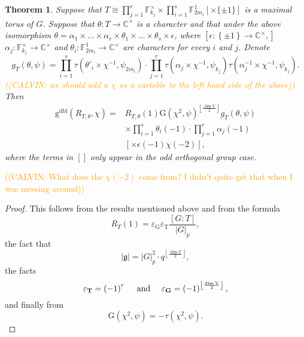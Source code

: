 \documentclass[12pt, reqno]{amsart}
\newtheorem{theorem}{Theorem}[section]
\theoremstyle{definition}
\theoremstyle{definition}
\theoremstyle{definition}
\newcommand{\cComplex}{\mathbb{C}}
\newcommand{\multiplicativegroup}[1]{#1^{\times}}
\newcommand{\sizeof}[1]{\left|#1\right|}
\newcommand{\hermitianSpace}{\mathrm{V}}
\newcommand{\fieldCharacter}{\psi}
\newcommand{\grpIndex}[2]{\left[#1:#2\right]}
\newcommand{\finiteField}{\mathbb{F}}
\newcommand{\finiteFieldExtension}[1]{\finiteField_{#1}}
\newcommand{\GaussSumScalar}[2]{\mathrm{G}\left(#1, #2\right)}
\newcommand{\dblVirtualGaussSumScalar}[2]{\mathrm{g}^{\mathrm{dbl}}\left(#1, #2\right)}
\newcommand{\GaussSumCharacter}[3]{\tau\left(#1 \times #2, #3\right)}
\newcommand{\lieAlgebra}{\mathfrak{g}}
\newcommand{\algebraicGroup}[1]{\boldsymbol{\mathrm{#1}}}
\newcommand{\calvin}[1]{\textcolor{orange}{\sffamily ((CALVIN: #1))}}
\begin{document}
\begin{theorem}\label{thm:computation-of-doubling-gauss-sum-scalar-for-deligne-lusztig-characters}
	Suppose that $T \cong \prod_{j=1}^r \multiplicativegroup{\finiteFieldExtension{k_j}} \times \prod_{i=1}^s \finiteFieldExtension{2m_i}^1 \left[\times \{\pm 1\}\right]$ is a maximal torus of $G$. Suppose that $\theta \colon T \to \multiplicativegroup{\cComplex}$ is a character and that under the above isomorphism $\theta = \alpha_1 \times \dots \times \alpha_r \times \theta_1 \times \dots \times \theta_s \times \epsilon$, where  $\left[\epsilon \colon \left\{\pm 1\right\} \to \multiplicativegroup{\cComplex},\right]$ $\alpha_j \colon \multiplicativegroup{\finiteFieldExtension{k_j}} \to \multiplicativegroup{\cComplex}$ and $\theta_i \colon \finiteFieldExtension{2m_i}^1 \to \multiplicativegroup{\cComplex}$ are characters for every $i$ and $j$. Denote $$g_T\left(\theta, \fieldCharacter\right) = \prod_{i=1}^s \GaussSumCharacter{\theta'_i}{\chi^{-1}}{\fieldCharacter_{2m_i}} \cdot  \prod_{j=1}^r \GaussSumCharacter{\alpha_j}{\chi^{-1}}{\fieldCharacter_{k_j}} \GaussSumCharacter{\alpha_j^{-1}}{\chi^{-1}}{\fieldCharacter_{k_j}}.$$ \calvin{we should add a $\chi$ as a variable to the left hand side of the above} Then
	\begin{align*}
		 \dblVirtualGaussSumScalar{R_{T, \theta}}{\chi} =& R_{T,\theta}\left(1\right) \GaussSumScalar{\chi^2}{\fieldCharacter}^{\left\lfloor\frac{\dim \hermitianSpace}{2}\right\rfloor} g_T\left(\theta, \fieldCharacter\right) \\
		& \times \prod_{i=1}^s \theta_i\left(-1\right) \cdot \prod_{j=1}^r \alpha_j\left(-1\right) \\
		& \left[\times \epsilon\left(-1\right) \chi\left(-2\right)\right],
	\end{align*}
	where the terms in $\left[\right]$ only appear in the odd orthogonal group case.
\end{theorem}
    \calvin{What does the $\chi(-2)$ come from? I didn't quite get that when I was messing around}
\begin{proof}
	This follows from the results mentioned above and from the formula $$R_T\left(1\right) = \varepsilon_{\algebraicGroup{G}} \varepsilon_{\algebraicGroup{T}} \frac{\grpIndex{G}{T}}{\sizeof{G}_p},$$ the fact that $$ \sizeof{\lieAlgebra} = \sizeof{G}_p^2 \cdot q^{\left\lfloor\frac{\dim \hermitianSpace}{2}\right\rfloor},$$
	the facts \begin{equation*}
		\varepsilon_{\algebraicGroup{T}} = \left(-1\right)^r \text{\,\,\,\,\,\, and \,\,\,\,\,\,}  \varepsilon_{\algebraicGroup{G}} = \left(-1\right)^{\left\lfloor\frac{\dim \hermitianSpace}{2}\right\rfloor},
	\end{equation*}
	and finally from $$\GaussSumScalar{\chi^2}{\fieldCharacter} = -\tau\left(\chi^2, \fieldCharacter\right).$$
\end{proof}
\end{document}
